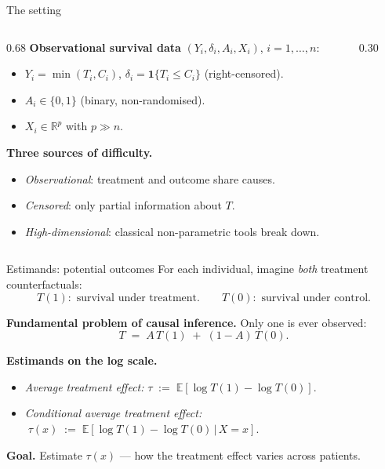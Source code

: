 \documentclass[10pt,aspectratio=169]{beamer}
\newcommand{\E}{\mathbb{E}}
\newcommand{\R}{\mathbb{R}}
\begin{document}
\begin{frame}{The setting}
\begin{columns}[T,onlytextwidth]
\begin{column}{0.68\textwidth}
\textbf{Observational survival data} $(Y_i, \delta_i, A_i, X_i)$, $i=1,\ldots,n$:
\begin{itemize}
  \item $Y_i = \min(T_i, C_i)$, $\delta_i = \mathbf{1}\{T_i \le C_i\}$ \quad (right-censored).
  \item $A_i \in \{0,1\}$ \quad (binary, non-randomised).
  \item $X_i \in \R^p$ \quad with $p \gg n$.
\end{itemize}

\bigskip

\textbf{Three sources of difficulty.}
\begin{itemize}
  \item \emph{Observational}: treatment and outcome share causes.
  \item \emph{Censored}: only partial information about $T$.
  \item \emph{High-dimensional}: classical non-parametric tools break down.
\end{itemize}
\end{column}
\begin{column}{0.30\textwidth}
\centering
{}
\end{column}
\end{columns}
\end{frame}

\begin{frame}{Estimands: potential outcomes}
For each individual, imagine \emph{both} treatment counterfactuals:
\[
T(1):\text{ survival under treatment.}\qquad
T(0):\text{ survival under control.}
\]

\textbf{Fundamental problem of causal inference.} Only one is ever observed:
\[
T \;=\; A\, T(1) \;+\; (1 - A)\, T(0).
\]

\bigskip

\textbf{Estimands on the log scale.}
\begin{itemize}
  \item \emph{Average treatment effect:} $\tau \;:=\; \E\!\left[\log T(1) - \log T(0)\right]$.
  \item \emph{Conditional average treatment effect:}
  $\;\tau(x) \;:=\; \E\!\left[\log T(1) - \log T(0)\,\big|\, X = x\right]$.
\end{itemize}

\medskip

\textbf{Goal.} Estimate $\tau(x)$ — how the treatment effect varies across patients.
\end{frame}
\end{document}

